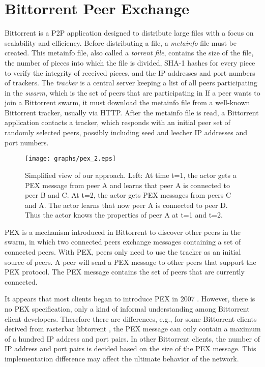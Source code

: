 \documentclass[paper]{ieice}
\begin{document}
\section{Bittorrent Peer Exchange}\label{background}
Bittorrent is a P2P application designed to distribute large files with a focus on scalability and efficiency.  
Before distributing a file, a \textit{metainfo} file must be created.  
This metainfo file, also called a \textit{torrent file}, contains the size of the file, the number of pieces into which the file is divided, SHA-1 hashes for every piece to verify the integrity of received pieces, and the IP addresses and port numbers of trackers.  
The \textit{tracker} is a central server keeping a list of all peers participating in the \textit{swarm}, which is the set of peers that are participating in %
If a peer wants to join a Bittorrent swarm, it must download the metainfo file from a well-known Bittorrent tracker, usually via HTTP. 
After the metainfo file is read, a Bittorrent application contacts a tracker, which responds with an initial peer set of randomly selected peers, possibly including seed and leecher IP addresses and port numbers.  

\begin{figure}[tb]
\begin{center}
\texttt{[image: graphs/pex\_2.eps]}
\end{center}
\caption{Simplified view of our approach. Left: At time t=1, the actor gets a PEX message from peer A and
learns that peer A is connected to peer B and C. At t=2, the actor gets  PEX messages from peers C and A. The actor
learns that now peer A is connected to peer D. Thus the actor knows the properties of peer A at t=1 and t=2.} 
\label{fig:pexworks}
\vspace{-5mm}
\end{figure}

PEX is a mechanism introduced in Bittorrent to discover other peers in the swarm, in which two connected peers exchange messages containing a set of connected peers.  
With PEX, peers only need to use the tracker as an initial source of peers.   
A peer will send a PEX message to other peers that support the PEX protocol. 
The PEX message contains the set of peers that are currently connected.

It appears that most clients began to introduce PEX in 2007  \cite{client}. 
However, there is no PEX specification, only a kind of informal understanding among Bittorrent client developers.
Therefore there are differences, e.g., for some Bittorrent clients derived from rasterbar libtorrent \cite{rasterbar}, the PEX message can only contain a maximum of a hundred IP address and port pairs. 
In other Bittorrent clients, the number of IP address and port pairs is decided based on the size of the PEX message.  
This implementation difference may affect the ultimate behavior of the network.
\end{document}
